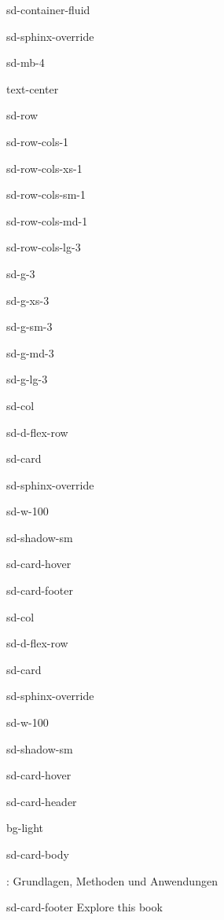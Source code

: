 \documentclass[letterpaper,10pt,english]{jupyterBook}
\let\sphinxpxdimen\pdfpxdimen\else\newdimen\sphinxpxdimen
\begin{document}
\begin{sphinxuseclass}{sd-container-fluid}
\begin{sphinxuseclass}{sd-sphinx-override}
\begin{sphinxuseclass}{sd-mb-4}
\begin{sphinxuseclass}{text-center}
\begin{sphinxuseclass}{sd-row}
\begin{sphinxuseclass}{sd-row-cols-1}
\begin{sphinxuseclass}{sd-row-cols-xs-1}
\begin{sphinxuseclass}{sd-row-cols-sm-1}
\begin{sphinxuseclass}{sd-row-cols-md-1}
\begin{sphinxuseclass}{sd-row-cols-lg-3}
\begin{sphinxuseclass}{sd-g-3}
\begin{sphinxuseclass}{sd-g-xs-3}
\begin{sphinxuseclass}{sd-g-sm-3}
\begin{sphinxuseclass}{sd-g-md-3}
\begin{sphinxuseclass}{sd-g-lg-3}
\begin{sphinxuseclass}{sd-col}
\begin{sphinxuseclass}{sd-d-flex-row}
\begin{sphinxuseclass}{sd-card}
\begin{sphinxuseclass}{sd-sphinx-override}
\begin{sphinxuseclass}{sd-w-100}
\begin{sphinxuseclass}{sd-shadow-sm}
\begin{sphinxuseclass}{sd-card-hover}
\begin{sphinxuseclass}{sd-card-footer}
\end{sphinxuseclass}
\end{sphinxuseclass}
\end{sphinxuseclass}
\end{sphinxuseclass}
\end{sphinxuseclass}
\end{sphinxuseclass}
\end{sphinxuseclass}
\end{sphinxuseclass}
\begin{sphinxuseclass}{sd-col}
\begin{sphinxuseclass}{sd-d-flex-row}
\begin{sphinxuseclass}{sd-card}
\begin{sphinxuseclass}{sd-sphinx-override}
\begin{sphinxuseclass}{sd-w-100}
\begin{sphinxuseclass}{sd-shadow-sm}
\begin{sphinxuseclass}{sd-card-hover}
\begin{sphinxuseclass}{sd-card-header}
\begin{sphinxuseclass}{bg-light}
\sphinxAtStartPar
{}

\end{sphinxuseclass}
\end{sphinxuseclass}
\begin{sphinxuseclass}{sd-card-body}
\noindent\sphinxincludegraphics[height=150\sphinxpxdimen]{{2019_Book_Messtechnik}.png}

\sphinxAtStartPar
{}: Grundlagen, Methoden und Anwendungen

\end{sphinxuseclass}
\begin{sphinxuseclass}{sd-card-footer}
\sphinxAtStartPar
Explore this book 


\end{sphinxuseclass}
\end{sphinxuseclass}
\end{sphinxuseclass}
\end{sphinxuseclass}
\end{sphinxuseclass}
\end{sphinxuseclass}
\end{sphinxuseclass}
\end{sphinxuseclass}
\end{sphinxuseclass}
\end{sphinxuseclass}
\end{sphinxuseclass}
\end{sphinxuseclass}
\end{sphinxuseclass}
\end{sphinxuseclass}
\end{sphinxuseclass}
\end{sphinxuseclass}
\end{sphinxuseclass}
\end{sphinxuseclass}
\end{sphinxuseclass}
\end{sphinxuseclass}
\end{sphinxuseclass}
\end{sphinxuseclass}
\end{sphinxuseclass}
\end{document}
